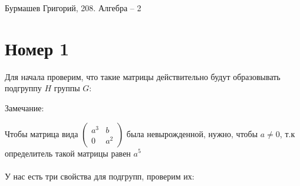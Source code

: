 \documentclass[a4paper,12pt]{article}
\author{Бурмашев Григорий, БПМИ-208}
\title{}
\date{\today}
\begin{document}
\begin{center}
Бурмашев Григорий, 208. Алгебра -- 2
\end{center}
\section*{Номер 1}
Для начала проверим, что такие матрицы действительно будут образовывать подгруппу $H$ группы $G$:

\begin{center}
Замечание:
\end{center}

Чтобы матрица вида $\begin{pmatrix}
a^3 & b \\ 0 & a^2
\end{pmatrix}$ была невырожденной, нужно, чтобы $a \neq 0$, т.к определитель такой матрицы равен $a^5$
\\\\
У нас есть три свойства для подгрупп, проверим их:
\end{document}

